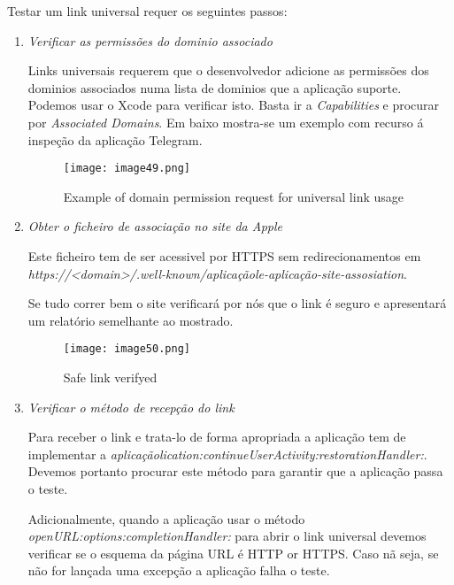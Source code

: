 Testar um link universal requer os seguintes passos:
\begin{enumerate}

\item \textit{Verificar as permissões do dominio associado}\par
\hfill\par
	Links universais requerem que o desenvolvedor adicione as permissões dos dominios associados numa lista de dominios que a aplicação suporte.
	Podemos usar o Xcode para verificar isto. Basta ir a \textit{Capabilities} e procurar por \textit{Associated Domains}. Em baixo mostra-se um exemplo com recurso á inspeção da aplicação Telegram.

\begin{figure}[H]
\centering
\texttt{[image: image49.png]}
\caption {Example of domain permission request for universal link usage}
\label {fig02}
\end{figure}

\item \textit{Obter o ficheiro de associação no site da Apple}\par
\hfill\par

	Este ficheiro tem de ser acessivel por HTTPS sem redirecionamentos em \textit{https://<domain>/.well-known/aplicaçãole-aplicação-site-assosiation}.

	Se tudo correr bem o site verificará por nós que o link é seguro e apresentará um relatório semelhante ao mostrado.

\begin{figure}[H]
\centering
\texttt{[image: image50.png]}
\caption {Safe link verifyed}
\label {fig02}
\end{figure}
	

\item \textit{Verificar o método de recepção do link}\par
\hfill\par

	Para receber o link e trata-lo de forma apropriada a aplicação tem de implementar a \textit{aplicaçãolication:continueUserActivity:restorationHandler:}. Devemos portanto procurar este método para garantir que a aplicação passa o teste.\par

	Adicionalmente, quando a aplicação usar o método \textit{openURL:options:completionHandler:} para abrir o link universal devemos verificar se o esquema da página URL é  HTTP or HTTPS. Caso nã seja, se não for lançada uma excepção a aplicação falha o teste.\par
\hfill\par


\end{enumerate}
